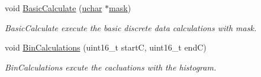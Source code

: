 \begin{DoxyCompactItemize}
void \hyperlink{class_soil_math_1_1_stats_a26ff743451ace6be360b4af3ffcf48c6}{Basic\+Calculate} (\hyperlink{_soil_math_types_8h_a65f85814a8290f9797005d3b28e7e5fc}{uchar} $\ast$\hyperlink{_gen_blob_8m_a2f6787d513f2bdbca6833c1c1ee04329}{mask})
\begin{DoxyCompactList}\small\item\em Basic\+Calculate execute the basic discrete data calculations with mask. \end{DoxyCompactList}\item 
void \hyperlink{class_soil_math_1_1_stats_ae93423b2eb3074051a01c0aee35070f1}{Bin\+Calculations} (uint16\+\_\+t start\+C, uint16\+\_\+t end\+C)
\begin{DoxyCompactList}\small\item\em Bin\+Calculations excute the cacluations with the histogram. \end{DoxyCompactList}\end{DoxyCompactItemize}
